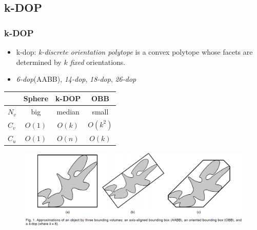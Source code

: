 \documentclass{beamer}
\begin{document}
\subsection{k-DOP}
	\begin{frame}
	\frametitle{k-DOP}
		\begin{itemize}
			\item k-dop: {\it k-discrete orientation polytope} is a convex polytope whose facets are determined by $k$ {\it fixed} orientations.
			\item {\it 6-dop}(AABB), {\it 14-dop}, {\it 18-dop}, {\it 26-dop}
		\end{itemize}
		\begin{center}
			\begin{tabular}{l || c | c | c}
					& Sphere & k-DOP & OBB \\
				\hline
				$N_{v}$ & big & median & small\\ 
				$C_{v}$ & $O(1)$ & $O(k)$ & $O(k^2)$\\
				$C_{u}$ & $O(1)$ & $O(n)$ & $O(k)$\\
			\end{tabular}
		\end{center}
	\end{frame}
	
	\begin{frame}
		\begin{figure}[h!]
			\centering
			\includegraphics[width=1.0\textwidth]{./figure/kDOPs.PNG}
		\end{figure}
	\end{frame}

\end{document}
